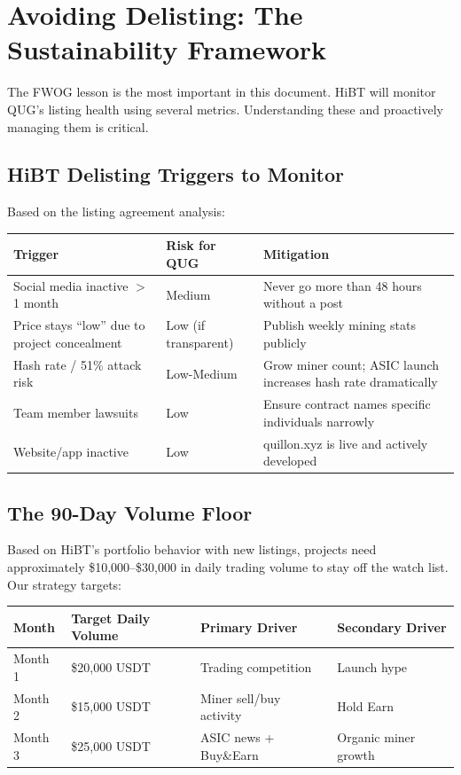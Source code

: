 \documentclass[11pt,a4paper]{article}
\begin{document}
\section{Avoiding Delisting: The Sustainability Framework}

The FWOG lesson is the most important in this document. HiBT will monitor QUG's listing health using several metrics. Understanding these and proactively managing them is critical.

\subsection{HiBT Delisting Triggers to Monitor}

Based on the listing agreement analysis:

\begin{center}
\begin{tabular}{L{4.5cm} L{3cm} L{5.5cm}}
  \toprule
  \textbf{Trigger} & \textbf{Risk for QUG} & \textbf{Mitigation} \\
  \midrule
  Social media inactive $>$ 1 month & Medium & Never go more than 48 hours without a post \\
  Price stays ``low'' due to project concealment & Low (if transparent) & Publish weekly mining stats publicly \\
  Hash rate / 51\% attack risk & Low-Medium & Grow miner count; ASIC launch increases hash rate dramatically \\
  Team member lawsuits & Low & Ensure contract names specific individuals narrowly \\
  Website/app inactive & Low & quillon.xyz is live and actively developed \\
  \bottomrule
\end{tabular}
\end{center}

\subsection{The 90-Day Volume Floor}

Based on HiBT's portfolio behavior with new listings, projects need approximately \$10,000--\$30,000 in daily trading volume to stay off the watch list. Our strategy targets:

\begin{center}
\begin{tabular}{C{2.5cm} C{3cm} C{3cm} C{3.5cm}}
  \toprule
  \textbf{Month} & \textbf{Target Daily Volume} & \textbf{Primary Driver} & \textbf{Secondary Driver} \\
  \midrule
  Month 1 & \$20,000 USDT & Trading competition & Launch hype \\
  Month 2 & \$15,000 USDT & Miner sell/buy activity & Hold Earn \\
  Month 3 & \$25,000 USDT & ASIC news + Buy\&Earn & Organic miner growth \\
  \bottomrule
\end{tabular}
\end{center}
\end{document}
